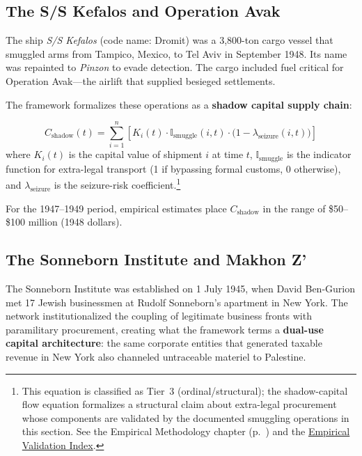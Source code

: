 \subsection{The S/S Kefalos and Operation Avak}

The ship \textit{S/S Kefalos} (code name: Dromit) was a 3,800-ton cargo vessel that smuggled arms from Tampico, Mexico, to Tel Aviv in September 1948. Its name was repainted to \textit{Pinzon} to evade detection. The cargo included fuel critical for Operation Avak---the airlift that supplied besieged settlements.

The framework formalizes these operations as a \textbf{shadow capital supply chain}:

\begin{equation}\label{eq:gp6-shadow-capital-flow}
C_{\text{shadow}}(t) = \sum_{i=1}^{n} \left[ K_i(t) \cdot \mathbb{I}_{\text{smuggle}}(i,t) \cdot \bigl(1 - \lambda_{\text{seizure}}(i,t)\bigr) \right]
\end{equation}
where $K_i(t)$ is the capital value of shipment $i$ at time $t$, $\mathbb{I}_{\text{smuggle}}$ is the indicator function for extra-legal transport (1 if bypassing formal customs, 0 otherwise), and $\lambda_{\text{seizure}}$ is the seizure-risk coefficient.\footnote{This equation is classified as Tier~3 (ordinal/structural); the shadow-capital flow equation formalizes a structural claim about extra-legal procurement whose components are validated by the documented smuggling operations in this section. See the Empirical Methodology chapter (p.~\pageref{ch:empirical_methodology}) and the \hyperref[app:empirical_index]{Empirical Validation Index}.}

For the 1947--1949 period, empirical estimates place $C_{\text{shadow}}$ in the range of \$50--\$100 million (1948 dollars).

\subsection{The Sonneborn Institute and Makhon Z'}

The Sonneborn Institute was established on 1 July 1945, when David Ben-Gurion met 17 Jewish businessmen at Rudolf Sonneborn's apartment in New York. The network institutionalized the coupling of legitimate business fronts with paramilitary procurement, creating what the framework terms a \textbf{dual-use capital architecture}: the same corporate entities that generated taxable revenue in New York also channeled untraceable materiel to Palestine.

